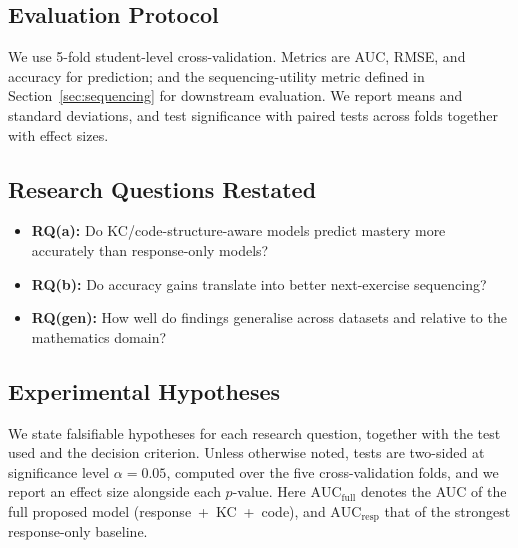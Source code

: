 \subsection{Evaluation Protocol}
We use 5-fold student-level cross-validation. Metrics are AUC, RMSE, and
accuracy for prediction; and the sequencing-utility metric defined in
Section~\ref{sec:sequencing} for downstream evaluation. We report means
and standard deviations, and test significance with paired tests across
folds together with effect sizes.

\subsection{Research Questions Restated}
\begin{itemize}
  \item \textbf{RQ(a):} Do KC/code-structure-aware models predict mastery
        more accurately than response-only models?
  \item \textbf{RQ(b):} Do accuracy gains translate into better
        next-exercise sequencing?
  \item \textbf{RQ(gen):} How well do findings generalise across datasets
        and relative to the mathematics domain?
\end{itemize}

\subsection{Experimental Hypotheses}
\label{sec:hypotheses}
We state falsifiable hypotheses for each research question, together with
the test used and the decision criterion. Unless otherwise noted, tests
are two-sided at significance level $\alpha = 0.05$, computed over the
five cross-validation folds, and we report an effect size alongside each
$p$-value. Here $\mathrm{AUC}_{\text{full}}$ denotes the AUC of the full
proposed model (response~+~KC~+~code), and $\mathrm{AUC}_{\text{resp}}$
that of the strongest response-only baseline.

